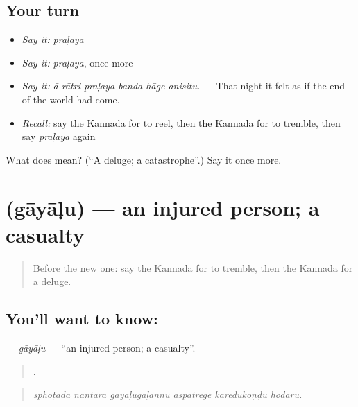\subsection*{Your turn}
\begin{itemize}
\raggedright
  \item \emph{Say it:} \emph{praḷaya}
  \item \emph{Say it:} \emph{praḷaya}, once more
  \item \emph{Say it:} \emph{ā rātri praḷaya banda hāge anisitu.} — That night it felt as if the end of the world had come.
  \item \emph{Recall:} say the Kannada for to reel, then the Kannada for to tremble, then say \emph{praḷaya} again
\end{itemize}

\begin{tcolorbox}[breakable,colback=teal!4,colframe=teal!35!black,title={Before you move on}]
What does  mean? (\textquotedblleft{}A deluge; a catastrophe\textquotedblright{}.) Say it once more.
\end{tcolorbox}
\section[\texorpdfstring{\kn{ಗಾಯಾಳು} (gāyāḷu)}{ಗಾಯಾಳು (gāyāḷu)}]{ (gāyāḷu) — an injured person; a casualty}

\label{lesson:KA-C346-gayalu}



\begin{quote}
Before the new one: say the Kannada for to tremble, then the Kannada for a deluge.
\end{quote}

\subsection*{You'll want to know: }
\textbf{} — \emph{gāyāḷu} — \textquotedblleft{}an injured person; a casualty\textquotedblright{}.

\begin{quote}
     .
\end{quote}

\begin{quote}
\emph{sphōṭada nantara gāyāḷugaḷannu āspatrege karedukoṇḍu hōdaru.}
\end{quote}

